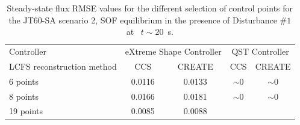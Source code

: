 \begin{table}[]
	\centering
	\begin{tabular}{|l|c|c|c|c|}
		\hline
		\rowcolor{color2}
		\multicolumn{5}{|c|}{\textbf{Disturbance $\#1$ flux RMSE steady state      ~ ~ Wb/2$\pi$}}                                                                 \\ \hline
		\rowcolor{color1}
		Controller                 & \multicolumn{2}{c|}{eXtreme Shape Controller} & \multicolumn{2}{c|}{QST Controller}                 \\ \hline
		LCFS reconstruction method & CCS                   & CREATE                & CCS                      & CREATE                   \\ \hline
		6 points                   & 0.0116                & 0.0133                & $\sim 0$               & $\sim 0$                  \\ \hline
		8 points                   & 0.0166                & 0.0181                & $\sim 0$                 & $\sim 0$                  \\ \hline
		19 points                  & 0.0085                & 0.0088                & \cellcolor[HTML]{C0C0C0} & \cellcolor[HTML]{C0C0C0} \\ \hline
	\end{tabular}
	\caption{Steady-state flux RMSE values for the different selection of control points for  the JT60-SA scenario 2, SOF equilibrium in the presence of  Disturbance $\# 1$  at ~$t\sim 20 $~s. }
	\label{fluxRMS_Urano_table}
\end{table}

